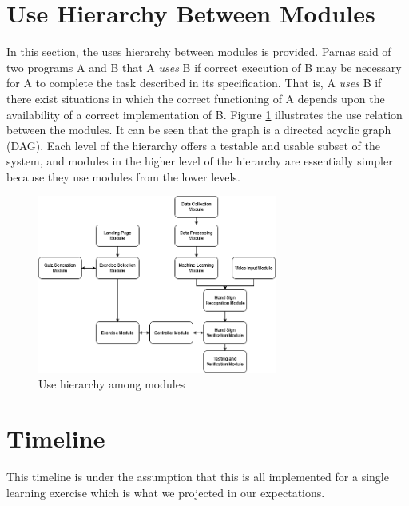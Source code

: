 \documentclass[12pt, titlepage]{article}
\begin{document}
\section{Use Hierarchy Between Modules} \label{SecUse}

In this section, the uses hierarchy between modules is
provided. Parnas said of two programs A and B that A {\em uses} B if
correct execution of B may be necessary for A to complete the task described in
its specification. That is, A {\em uses} B if there exist situations in which
the correct functioning of A depends upon the availability of a correct
implementation of B.  Figure \ref{FigUH} illustrates the use relation between
the modules. It can be seen that the graph is a directed acyclic graph
(DAG). Each level of the hierarchy offers a testable and usable subset of the
system, and modules in the higher level of the hierarchy are essentially simpler
because they use modules from the lower levels.

\begin{figure}[H]
\centering
\includegraphics[width=0.7\textwidth]{UsesHierarchyRev1.png}
\caption{Use hierarchy among modules}
\label{FigUH}
\end{figure}

\section{Timeline}
This timeline is under the assumption that this is all implemented for a single learning exercise which is what we projected in our expectations.
\end{document}
